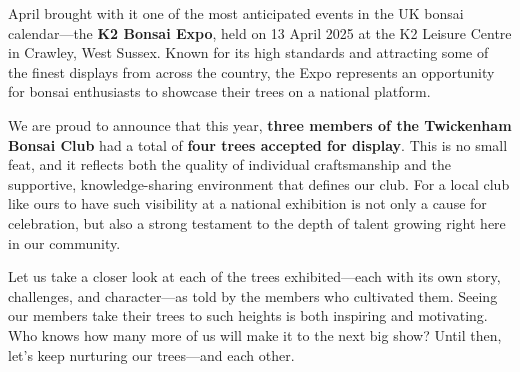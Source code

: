 \label{2025-05-show}
\noindent
April brought with it one of the most anticipated events in the UK bonsai calendar---the \textbf{K2 Bonsai Expo}, held on 13 April 2025 at the K2 Leisure Centre in Crawley, West Sussex.
Known for its high standards and attracting some of the finest displays from across the country, the Expo represents an opportunity for bonsai enthusiasts to showcase their trees on a national platform.

We are proud to announce that this year, \textbf{three members of the Twickenham Bonsai Club} had a total of \textbf{four trees accepted for display}.
This is no small feat, and it reflects both the quality of individual craftsmanship and the supportive, knowledge\--sharing environment that defines our club.
For a local club like ours to have such visibility at a national exhibition is not only a cause for celebration, but also a strong testament to the depth of talent growing right here in our community.

Let us take a closer look at each of the trees exhibited---each with its own story, challenges, and character---as told by the members who cultivated them.
Seeing our members take their trees to such heights is both inspiring and motivating.
Who knows how many more of us will make it to the next big show?
Until then, let's keep nurturing our trees---and each other.
